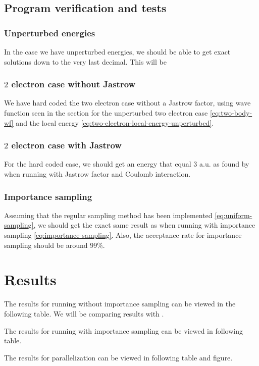 \documentclass[11pt]{article}
\begin{document}
\subsection{Program verification and tests}
\subsubsection{Unperturbed energies}
In the case we have unperturbed energies, we should be able to get exact solutions down to the very last decimal. This will be 

\subsubsection{\texorpdfstring{$2$}{a} electron case without Jastrow}
We have hard coded the two electron case without a Jastrow factor, using wave function seen in the section for the unperturbed two electron case \eqref{eq:two-body-wf} and the local energy \eqref{eq:two-electron-local-energy-unperturbed}.

\subsubsection{\texorpdfstring{$2$}{a} electron case with Jastrow}
For the hard coded case, we should get an energy that equal 3 a.u. as found by \citet{PhysRevA.48.3561} when running with Jastrow factor and Coulomb interaction.

\subsubsection{Importance sampling}
Assuming that the regular sampling method has been implemented \eqref{eq:uniform-sampling}, we should get the exact same result as when running with importance sampling \eqref{eq:importance-sampling}. Also, the acceptance rate for importance sampling should be around $99\%$\citet{komp2015}.

\section{Results}
The results for running without importance sampling can be viewed in the following table. We will be comparing results with \citet{PhysRevB.84.115302}.

The results for running with importance sampling can be viewed in following table.

The results for parallelization can be viewed in following table and figure.
\end{document}
